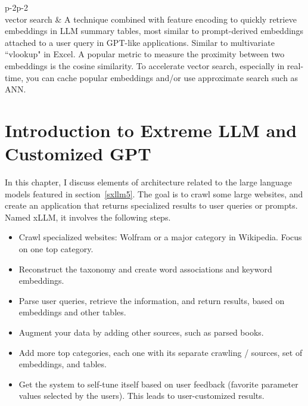 \documentclass[oneside,10pt]{book}
\begin{document}
\begin{center}
\begin{longtblr}{p{-2\tabcolsep}p{-2\tabcolsep}}
\\
\hline
vector search  & A technique combined with 
\textcolor{index}{feature encoding} to quickly retrieve embeddings in LLM summary tables, most similar to prompt-derived embeddings attached to a user query in GPT-like applications. Similar to multivariate ``vlookup" in Excel. A popular metric to measure the proximity between two embeddings is the 
\textcolor{index}{cosine similarity}. To accelerate \textcolor{index}{vector search}, especially in real-time, you can 
\textcolor{index}{cache} popular embeddings and/or use approximate search such as \textcolor{index}{ANN}.\\
\hline
\end{longtblr}
\end{center}


\chapter{Introduction to Extreme LLM and Customized GPT}\label{aasdaaqw}

In this chapter, I discuss elements of architecture related to the \textcolor{index}{large language models} featured in section~\ref{sxllm5}. The goal is to crawl some large websites, and create an application that returns specialized results to user queries or prompts. 
Named \textcolor{index}{xLLM}, it involves the following steps.
\vspace{1ex}


\begin{itemize}
\item Crawl specialized websites: Wolfram or a major category in Wikipedia. Focus on one top category.
\item Reconstruct the taxonomy and create word associations and keyword \textcolor{index}{embeddings}.
\item Parse user queries, retrieve the information, and return results, based on embeddings and other tables. 
\item Augment your data by adding other sources, such as parsed books.
\item Add more top categories, each one with its separate crawling / sources, set of embeddings, and tables.
\item Get the system to self-tune itself based on user feedback (favorite parameter values selected by the users). This leads to user-customized results.
\end{itemize}
\vspace{1ex}
\end{document}
